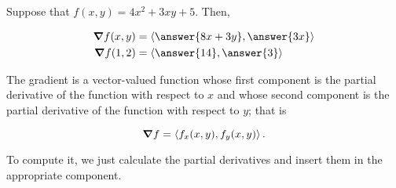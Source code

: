 \documentclass{ximera}
\author{Jim Talamo}
\begin{document}
\begin{exercise}
Suppose that $f(x,y) = 4x^2+3xy+5$.  Then,

\begin{align*}
\grad{f}(x,y) &= \vector{\answer{8x+3y},\answer{3x}} \\
\grad{f}(1,2) &= \vector{\answer{14},\answer{3}}
\end{align*}

\begin{hint}
The gradient is a vector-valued function whose first component is the partial derivative of the function with respect to $x$ and whose second component is the partial derivative of the function with respect to $y$; that is

\[
\boldsymbol\nabla{f} = \left\langle f_x(x,y) , f_y(x,y)\right\rangle.
\]

To compute it, we just calculate the partial derivatives and insert them in the appropriate component.

\end{hint}
\end{exercise}
\end{document}
